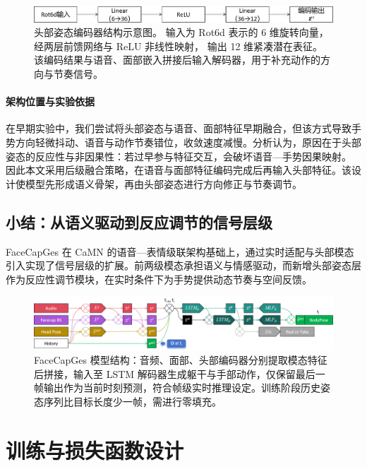 \begin{figure}[h!t]
\centering
\includegraphics[width=0.8\linewidth]{figures/Fig_headencoder.png}
\caption{头部姿态编码器结构示意图。
输入为 Rot6d 表示的 6 维旋转向量，经两层前馈网络与 ReLU 非线性映射，
输出 12 维紧凑潜在表征。
该编码结果与语音、面部嵌入拼接后输入解码器，用于补充动作的方向与节奏信号。}
\label{fig_headencoder}
\end{figure}

\paragraph{架构位置与实验依据}
在早期实验中，我们尝试将头部姿态与语音、面部特征早期融合，但该方式导致手势方向轻微抖动、语音与动作节奏错位，收敛速度减慢。分析认为，原因在于头部姿态的反应性与非因果性：若过早参与特征交互，会破坏语音—手势因果映射。  
因此本文采用后级融合策略，在语音与面部特征编码完成后再输入头部特征。该设计使模型先形成语义骨架，再由头部姿态进行方向修正与节奏调节。

\subsection{小结：从语义驱动到反应调节的信号层级}

FaceCapGes 在 CaMN 的语音—表情级联架构基础上，通过实时适配与头部模态引入实现了信号层级的扩展。前两级模态承担语义与情感驱动，而新增头部姿态层作为反应性调节模块，在实时条件下为手势提供动态节奏与空间反馈。

\begin{figure}[h!t]
\centering
\includegraphics[width=\textwidth]{figures/Fig1.png}
\caption{FaceCapGes 模型结构：音频、面部、头部编码器分别提取模态特征后拼接，输入至 LSTM 解码器生成躯干与手部动作，仅保留最后一帧输出作为当前时刻预测，符合帧级实时推理设定。训练阶段历史姿态序列比目标长度少一帧，需进行零填充。}
\label{fig1_}
\end{figure}

\section{训练与损失函数设计}
\label{sec:training}

